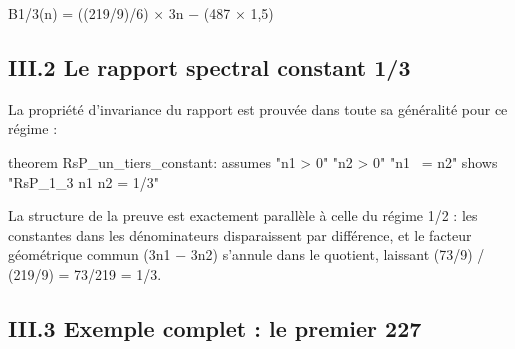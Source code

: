 \documentclass[11pt,a4paper]{article}
\begin{document}
B1/3(n) = ((219/9)/6) × 3n − (487 × 1,5)

\subsection{III.2 Le rapport spectral constant 1/3}

La propriété d'invariance du rapport est prouvée dans toute sa généralité pour ce régime :

\begin{holcode}[title={Code HOL — Théorème RsP = 1/3}]
theorem RsP_un_tiers_constant:
 assumes "n1 > 0" "n2 > 0" "n1 ~= n2"
 shows "RsP_1_3 n1 n2 = 1/3"
\end{holcode}

La structure de la preuve est exactement parallèle à celle du régime 1/2 : les constantes dans les dénominateurs disparaissent par différence, et le facteur géométrique commun (3n1 − 3n2) s'annule dans le quotient, laissant (73/9) / (219/9) = 73/219 = 1/3.

\subsection{III.3 Exemple complet : le premier 227}
\end{document}
